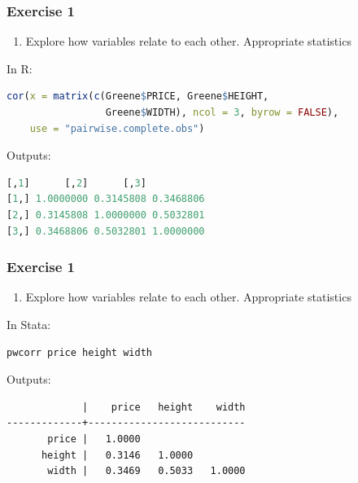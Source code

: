 \documentclass[xcolor=table]{beamer}
\begin{document}


\begin{frame}[fragile]
\frametitle{Exercise 1}
\begin{enumerate}
\item Explore how variables relate to each other. Appropriate statistics \pause
\end{enumerate}
In R:
\begin{lstlisting}[language = R]
cor(x = matrix(c(Greene$PRICE, Greene$HEIGHT, 
				 Greene$WIDTH), ncol = 3, byrow = FALSE), 
    use = "pairwise.complete.obs")
\end{lstlisting} \pause
Outputs:
\begin{lstlisting}[language = R]
          [,1]      [,2]      [,3]
[1,] 1.0000000 0.3145808 0.3468806
[2,] 0.3145808 1.0000000 0.5032801
[3,] 0.3468806 0.5032801 1.0000000
\end{lstlisting}
\end{frame}

\begin{frame}[fragile]
\frametitle{Exercise 1}
\begin{enumerate}
\item Explore how variables relate to each other. Appropriate statistics \pause
\end{enumerate}
In Stata:
\begin{lstlisting}
pwcorr price height width
\end{lstlisting} \pause
Outputs:
\begin{lstlisting}
             |    price   height    width
-------------+---------------------------
       price |   1.0000 
      height |   0.3146   1.0000 
       width |   0.3469   0.5033   1.0000 


\end{lstlisting}
\end{frame}
\end{document}

